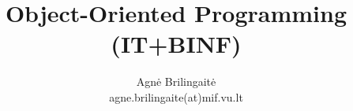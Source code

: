 


\title{Object-Oriented Programming (IT+BINF)}

\author[A.~Brilingait\.{e}]{Agn\.{e} Brilingait\.{e}\\agne.brilingaite(at)mif.vu.lt}





